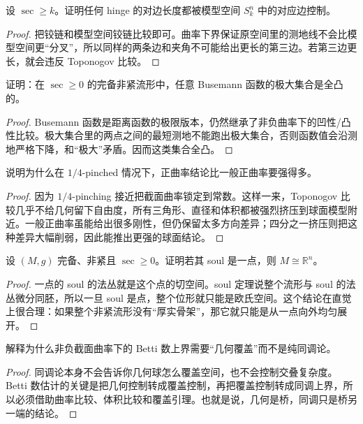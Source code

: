 \documentclass[11pt,a4paper,openany]{ctexbook}
\numberwithin{equation}{chapter}
\begin{document}
\begin{exercise}
设 \(\sec\ge k\)。证明任何 hinge 的对边长度都被模型空间 \(S_k^n\) 中的对应边控制。
\end{exercise}
\begin{proof}
把铰链和模型空间铰链比较即可。曲率下界保证原空间里的测地线不会比模型空间更“分叉”，所以同样的两条边和夹角不可能给出更长的第三边。若第三边更长，就会违反 Toponogov 比较。  
\end{proof}

\begin{exercise}
证明：在 \(\sec\ge 0\) 的完备非紧流形中，任意 Busemann 函数的极大集合是全凸的。
\end{exercise}
\begin{proof}
Busemann 函数是距离函数的极限版本，仍然继承了非负曲率下的凹性/凸性比较。极大集合里的两点之间的最短测地不能跑出极大集合，否则函数值会沿测地严格下降，和“极大”矛盾。因而这类集合全凸。  
\end{proof}

\begin{exercise}
说明为什么在 \(1/4\)-pinched 情况下，正曲率结论比一般正曲率要强得多。
\end{exercise}
\begin{proof}
因为 \(1/4\)-pinching 接近把截面曲率锁定到常数。这样一来，Toponogov 比较几乎不给几何留下自由度，所有三角形、直径和体积都被强烈挤压到球面模型附近。一般正曲率虽能给出很多刚性，但仍保留太多方向差异；四分之一挤压则把这种差异大幅削弱，因此能推出更强的球面结论。  
\end{proof}

\begin{exercise}
设 \((M,g)\) 完备、非紧且 \(\sec\ge 0\)。证明若其 soul 是一点，则 \(M\cong \mathbb R^n\)。
\end{exercise}
\begin{proof}
一点的 soul 的法丛就是这个点的切空间。soul 定理说整个流形与 soul 的法丛微分同胚，所以一旦 soul 是点，整个位形就只能是欧氏空间。这个结论在直觉上很合理：如果整个非紧流形没有“厚实骨架”，那它就只能是从一点向外均匀展开。  
\end{proof}

\begin{exercise}
解释为什么非负截面曲率下的 Betti 数上界需要“几何覆盖”而不是纯同调论。
\end{exercise}
\begin{proof}
同调论本身不会告诉你几何球怎么覆盖空间，也不会控制交叠复杂度。Betti 数估计的关键是把几何控制转成覆盖控制，再把覆盖控制转成同调上界，所以必须借助曲率比较、体积比较和覆盖引理。也就是说，几何是桥，同调只是桥另一端的结论。  
\end{proof}
\end{document}
